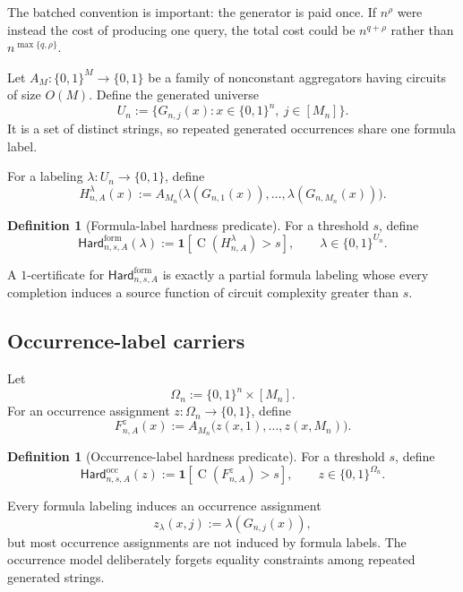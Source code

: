 \documentclass[11pt]{article}
\theoremstyle{definition}
\newtheorem{definition}[theorem]{Definition}
\newcommand{\bits}{\{0,1\}}
\newcommand{\Ckt}{\operatorname{C}}
\newcommand{\HardF}{\mathsf{Hard}^{\mathrm{form}}}
\newcommand{\HardO}{\mathsf{Hard}^{\mathrm{occ}}}
\begin{document}
The batched convention is important: the generator is paid once.  If $n^\rho$ were instead the cost of producing one query, the total cost could be $n^{q+\rho}$ rather than $n^{\max\{q,\rho\}}$.

Let $A_M:\bits^M\to\bits$ be a family of nonconstant aggregators having circuits of size $O(M)$.  Define the generated universe
\[
  U_n:=\{G_{n,j}(x):x\in\bits^n,\ j\in[M_n]\}.
\]
It is a set of distinct strings, so repeated generated occurrences share one formula label.

For a labeling $\lambda:U_n\to\bits$, define
\begin{equation}\label{eq:formula-carrier}
  H_{n,A}^{\lambda}(x)
  :=A_{M_n}\bigl(\lambda(G_{n,1}(x)),\ldots,
                    \lambda(G_{n,M_n}(x))\bigr).
\end{equation}

\begin{definition}[Formula-label hardness predicate]\label{def:hard-form}
For a threshold $s$, define
\[
  \HardF_{n,s,A}(\lambda)
  :=\mathbf 1[\Ckt(H_{n,A}^{\lambda})>s],
  \qquad \lambda\in\bits^{U_n}.
\]
\end{definition}

A $1$-certificate for $\HardF_{n,s,A}$ is exactly a partial formula labeling whose every completion induces a source function of circuit complexity greater than $s$.

\subsection{Occurrence-label carriers}

Let
\[
  \Omega_n:=\bits^n\times[M_n].
\]
For an occurrence assignment $z:\Omega_n\to\bits$, define
\begin{equation}\label{eq:occ-carrier}
  F_{n,A}^{z}(x)
  :=A_{M_n}\bigl(z(x,1),\ldots,z(x,M_n)\bigr).
\end{equation}

\begin{definition}[Occurrence-label hardness predicate]\label{def:hard-occ}
For a threshold $s$, define
\[
  \HardO_{n,s,A}(z)
  :=\mathbf 1[\Ckt(F_{n,A}^{z})>s],
  \qquad z\in\bits^{\Omega_n}.
\]
\end{definition}

Every formula labeling induces an occurrence assignment
\[
  z_\lambda(x,j):=\lambda(G_{n,j}(x)),
\]
but most occurrence assignments are not induced by formula labels.  The occurrence model deliberately forgets equality constraints among repeated generated strings.
\end{document}
